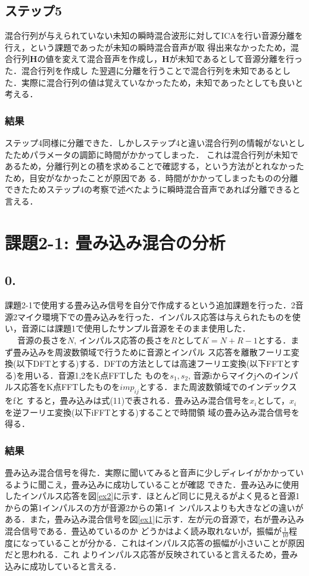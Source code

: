 \documentclass[a4j]{jarticle}
\begin{document}
\subsection{ステップ5}
混合行列が与えられていない未知の瞬時混合波形に対してICAを行い音源分離を行え，という課題であったが未知の瞬時混合音声が取
得出来なかったため，混合行列$\bm{H}$の値を変えて混合音声を作成し，$\bm{H}$が未知であるとして音源分離を行った．混合行列を作成し
た翌週に分離を行うことで混合行列を未知であるとした．実際に混合行列の値は覚えていなかったため，未知であったとしても良いと
考える．
\subsubsection{結果}
ステップ4同様に分離できた．しかしステップ4と違い混合行列の情報がないとしたためパラメータの調節に時間がかかってしまった．
これは混合行列が未知であるため，分離行列との積を求めることで確認する，という方法がとれなかったため，目安がなかったことが原因であ
る．時間がかかってしまったものの分離できたためステップ4の考察で述べたように瞬時混合音声であれば分離できると言える．

\section{課題2-1: 畳み込み混合の分析}
\subsection{0.}
課題2-1で使用する畳み込み信号を自分で作成するという追加課題を行った．2音
源2マイク環境下での畳み込みを行った．インパルス応答は与えられたものを使
い，音源には課題1で使用したサンプル音源をそのまま使用した．\\ \ \ \ 
音源の長さを$N$, インパルス応答の長さを$R$として$K = N + R -1$とする．まず畳み込みを周波数領域で行うために音源とインパル
ス応答を離散フーリエ変換(以下DFTとする)する．DFTの方法としては高速フーリエ変換(以下FFTとする)を用いる．音源1,2をK点FFTした
ものを$s_1, s_2$, 音源iからマイクjへのインパルス応答をK点FFTしたものを$imp_{ij}$とする．また周波数領域でのインデックスをfと
すると，畳み込みは式(11)で表される．畳み込み混合信号を$x_i$として，$x_i$を逆フーリエ変換(以下iFFTとする)することで時間領
域の畳み込み混合信号を得る．
\subsubsection{結果}
畳み込み混合信号を得た．実際に聞いてみると音声に少しディレイがかかっているように聞こえ，畳み込みに成功していることが確認
できた．畳み込みに使用したインパルス応答を図\ref{ex2}に示す．ほとんど同じに見えるがよく見ると音源1からの第1インパルスの方が音源2からの第1イ
ンパルスよりも大きなどの違いがある．また，畳み込み混合信号を図\ref{ex1}に示す．左が元の音源で，右が畳み込み混合信号である．畳込めているのか
どうかはよく読み取れないが，振幅が$\frac{1}{10}$程度になっていることが分かる．これはインパルス応答の振幅が小さいことが原因だと思われる．これ
よりインパルス応答が反映されていると言えるため，畳み込みに成功していると言える．
\end{document}
